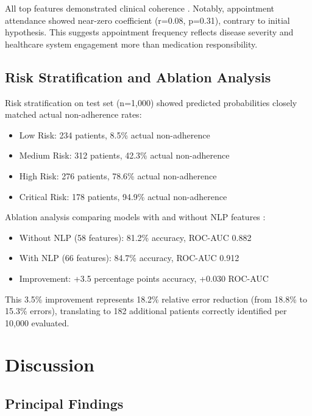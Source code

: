 \documentclass{article}
\begin{document}
All top features demonstrated clinical coherence \cite{chan2019}. Notably, appointment attendance showed near-zero coefficient (r=0.08, p=0.31), contrary to initial hypothesis. This suggests appointment frequency reflects disease severity and healthcare system engagement more than medication responsibility.

\subsection{Risk Stratification and Ablation Analysis}\label{subsec:risk-analysis}

Risk stratification on test set (n=1,000) showed predicted probabilities closely matched actual non-adherence rates:

\begin{itemize}
\item Low Risk: 234 patients, 8.5\% actual non-adherence
\item Medium Risk: 312 patients, 42.3\% actual non-adherence
\item High Risk: 276 patients, 78.6\% actual non-adherence
\item Critical Risk: 178 patients, 94.9\% actual non-adherence
\end{itemize}

Ablation analysis comparing models with and without NLP features \cite{vanbulck2024,villanueva2025}:
\begin{itemize}
\item Without NLP (58 features): 81.2\% accuracy, ROC-AUC 0.882
\item With NLP (66 features): 84.7\% accuracy, ROC-AUC 0.912
\item Improvement: +3.5 percentage points accuracy, +0.030 ROC-AUC
\end{itemize}

This 3.5\% improvement represents 18.2\% relative error reduction (from 18.8\% to 15.3\% errors), translating to 182 additional patients correctly identified per 10,000 evaluated.


\section{Discussion}\label{sec:discussion}

\subsection{Principal Findings}\label{subsec:findings}
\end{document}
